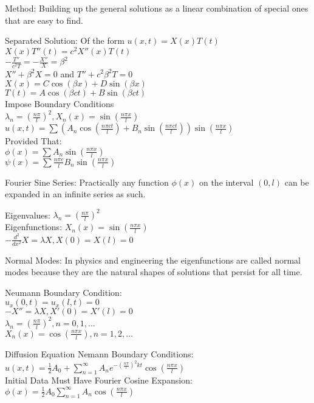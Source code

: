 Method: Building up the general solutions as a linear combination of special ones that are easy to find.

Separated Solution: Of the form $u(x,t)=X(x)T(t)$ \\
$X(x)T''(t)=c^2 X''(x)T(t)$ \\
$-\frac{T''}{c^2 T}=-\frac{X''}{X}=\beta^2$ \\
$X''+\beta^2 X=0$ and $T''+c^2 \beta^2 T=0$ \\
$X(x)=C \cos(\beta x)+D\sin(\beta x)$ \\
$T(t)=A \cos(\beta ct)+B\sin(\beta ct)$ \\
Impose Boundary Conditions \\
$\lambda_n = \left(\frac{n \pi}{l} \right)^2, X_n (x)=\sin \left(\frac{n \pi x}{l} \right)$ \\
$u(x,t)=\sum \left(A_n \cos \left(\frac{n \pi ct}{l} \right) + B_n \sin \left(\frac{n \pi ct}{l} \right) \right) \sin \left(\frac{n \pi x}{l} \right)$ \\
Provided That: \\
$\phi (x) = \sum A_n \sin \left(\frac{n \pi x}{l} \right)$ \\
$\psi (x) = \sum \frac{n \pi c}{l} B_n \sin \left(\frac{n \pi x}{l} \right)$

Fourier Sine Series: Practically any function $\phi (x)$ on the interval $(0,l)$ can be expanded in an infinite series as such.

Eigenvalues: $\lambda_n = \left(\frac{n \pi}{l} \right)^2$ \\
Eigenfunctions: $X_n (x)=\sin \left(\frac{n \pi x}{l} \right)$ \\
$-\frac{d^2}{dx^2} X=\lambda X, X(0)=X(l)=0$

Normal Modes: In physics and engineering the eigenfunctions are called normal modes because they are the natural shapes of solutions that persist for all time.

Neumann Boundary Condition: \\
$u_x(0,t)=u_x(l,t)=0$ \\
$-X''=\lambda X, X'(0)=X'(l)=0$ \\
$\lambda_n = \left(\frac{n \pi}{l} \right)^2, n=0,1,\dots$ \\
$X_n (x)=\cos \left(\frac{n \pi x}{l} \right), n=1,2,\dots$

Diffusion Equation Nemann Boundary Conditions: \\
$u(x,t)=\frac{1}{2}A_0+\sum_{n=1}^{\infty} A_n e^{-\left(\frac{n \pi}{l} \right)^2 kt} \cos \left(\frac{n \pi x}{l} \right)$ \\
Initial Data Must Have Fourier Cosine Expansion: \\
$\phi (x)=\frac{1}{2} A_0 \sum_{n=1}^{\infty} A_n \cos \left(\frac{n \pi x}{l} \right)$


